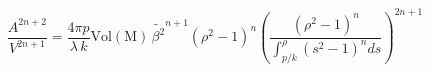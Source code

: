 \begin{equation}
\frac{A^{2n+2}}{V^{2n+1}}=\frac{4\pi
p}{\lambda\,k}\mathrm{Vol(M)}\,\tilde{\beta^2}^{n+1}(\rho^2-1)^n
\left(\frac{(\rho^2-1)^n}{\int_{p/k}^{\rho} (s^2-1)^n
ds}\right)^{2n+1} \label{bb}
\end{equation}

